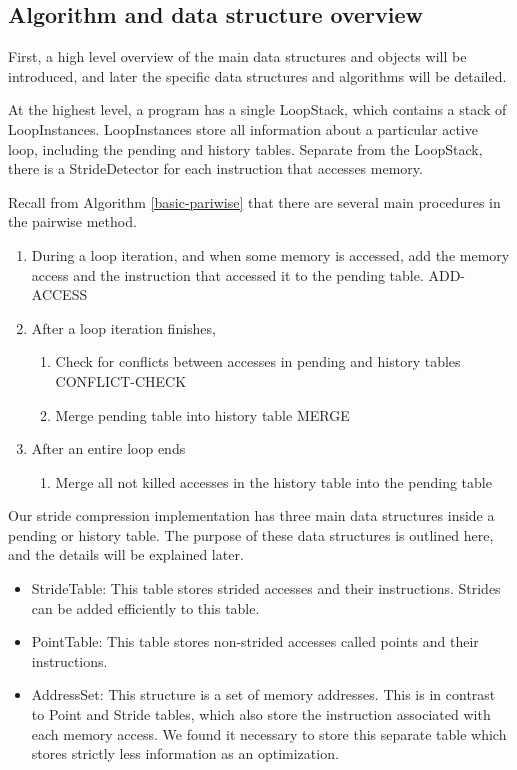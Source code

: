 \documentclass[12pt,twoside]{reedthesis}
\begin{document}
		\subsection{Algorithm and data structure overview}
		
			
			First, a high level overview of the main data structures and objects will be introduced, and later the specific data structures and algorithms will be detailed. 
			
			At the highest level, a program has a single LoopStack, which contains a stack of LoopInstances. LoopInstances store all information about a particular active loop, including the pending and history tables.	Separate from the LoopStack, there is a StrideDetector for each instruction that accesses memory. 
			
			Recall from Algorithm \ref{basic-pariwise} that there are several main procedures in the pairwise method. 
			
			\begin{enumerate}
				\item During a loop iteration, and when some memory is accessed, add the memory access and the instruction that accessed it to the pending table. ADD-ACCESS
				\item After a loop iteration finishes,
				\begin{enumerate}
					\item Check for conflicts between accesses in pending and history tables CONFLICT-CHECK
					\item Merge pending table into history table MERGE
				\end{enumerate}
				\item After an entire loop ends
				\begin{enumerate}
					\item Merge all not killed accesses in the history table into the pending table 
				\end{enumerate}
			\end{enumerate}
			
			Our stride compression implementation has three main data structures inside a pending or history table. The purpose of these data structures is outlined here, and the details will be explained later. 
			
			\begin{itemize}
				\item StrideTable: This table stores strided accesses and their instructions. Strides can be added efficiently to this table.
				\item PointTable: This table stores non-strided accesses called points and their instructions. 
				\item AddressSet: This structure is a set of memory addresses.
				This is in contrast to Point and Stride tables, which also store the instruction associated with each memory access. We found it necessary to store this separate table which stores strictly less information as an optimization. %
			\end{itemize}
		
\end{document}
